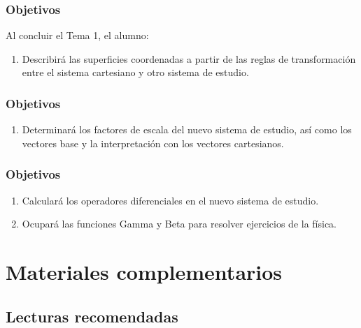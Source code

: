 \documentclass[12pt]{beamer}
\begin{document}
\begin{frame}
\frametitle{Objetivos}
Al concluir el Tema 1, el alumno:
\pause
{}
\begin{enumerate}[<+->]
\item Describirá las superficies coordenadas a partir de las reglas de transformación entre el sistema cartesiano y otro sistema de estudio.
\seti
\end{enumerate}
\end{frame}
\begin{frame}
\frametitle{Objetivos}
\begin{enumerate}[<+->]
\conti
\item Determinará los factores de escala del nuevo sistema de estudio, así como los vectores base y la interpretación con los vectores cartesianos.
\seti
\end{enumerate}
\end{frame}
\begin{frame}
\frametitle{Objetivos}
\begin{enumerate}[<+->]
\conti
\item Calculará los operadores diferenciales en el nuevo sistema de estudio.
\item Ocupará las funciones Gamma y Beta para resolver ejercicios de la física.
\end{enumerate}
\end{frame}

\section{Materiales complementarios}
\subsection{Lecturas recomendadas}
\end{document}
